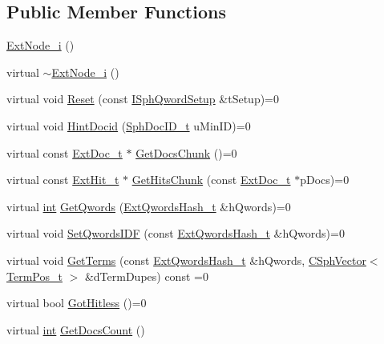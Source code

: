 \subsection*{Public Member Functions}
\begin{DoxyCompactItemize}
\item 
\hyperlink{classExtNode__i_a82aba70c733c6e7ba6d46217315874b4}{Ext\-Node\-\_\-i} ()
\item 
virtual \hyperlink{classExtNode__i_aabf49e11ce209f209ae1341c54f7c493}{$\sim$\-Ext\-Node\-\_\-i} ()
\item 
virtual void \hyperlink{classExtNode__i_adb612662cec19c54649244bec75d0e82}{Reset} (const \hyperlink{classISphQwordSetup}{I\-Sph\-Qword\-Setup} \&t\-Setup)=0
\item 
virtual void \hyperlink{classExtNode__i_a83fface58e270a2074023d441d902ad1}{Hint\-Docid} (\hyperlink{sphinx_8h_a3176771631c12a9e4897272003e6b447}{Sph\-Doc\-I\-D\-\_\-t} u\-Min\-I\-D)=0
\item 
virtual const \hyperlink{structExtDoc__t}{Ext\-Doc\-\_\-t} $\ast$ \hyperlink{classExtNode__i_a729fb08a7ad224275224ec3c9e89751a}{Get\-Docs\-Chunk} ()=0
\item 
virtual const \hyperlink{structExtHit__t}{Ext\-Hit\-\_\-t} $\ast$ \hyperlink{classExtNode__i_a486fcc633078a57c60de634c5c35f084}{Get\-Hits\-Chunk} (const \hyperlink{structExtDoc__t}{Ext\-Doc\-\_\-t} $\ast$p\-Docs)=0
\item 
virtual \hyperlink{sphinxexpr_8cpp_a4a26e8f9cb8b736e0c4cbf4d16de985e}{int} \hyperlink{classExtNode__i_a11e49c90db27942ee8f5a174ebfe7212}{Get\-Qwords} (\hyperlink{sphinxsearch_8cpp_a814fc096e1ffb29d072d79b72b702fe6}{Ext\-Qwords\-Hash\-\_\-t} \&h\-Qwords)=0
\item 
virtual void \hyperlink{classExtNode__i_a73f0d94f75d927ace362079f4794d702}{Set\-Qwords\-I\-D\-F} (const \hyperlink{sphinxsearch_8cpp_a814fc096e1ffb29d072d79b72b702fe6}{Ext\-Qwords\-Hash\-\_\-t} \&h\-Qwords)=0
\item 
virtual void \hyperlink{classExtNode__i_a54f48b44df2f712dc1282a401a14e108}{Get\-Terms} (const \hyperlink{sphinxsearch_8cpp_a814fc096e1ffb29d072d79b72b702fe6}{Ext\-Qwords\-Hash\-\_\-t} \&h\-Qwords, \hyperlink{classCSphVector}{C\-Sph\-Vector}$<$ \hyperlink{structTermPos__t}{Term\-Pos\-\_\-t} $>$ \&d\-Term\-Dupes) const =0
\item 
virtual bool \hyperlink{classExtNode__i_a08afc9f33bb800121ef8dccca67bdd75}{Got\-Hitless} ()=0
\item 
virtual \hyperlink{sphinxexpr_8cpp_a4a26e8f9cb8b736e0c4cbf4d16de985e}{int} \hyperlink{classExtNode__i_a8db3d56445b501b3f2375f3f63991ced}{Get\-Docs\-Count} ()

\end{DoxyCompactItemize}
